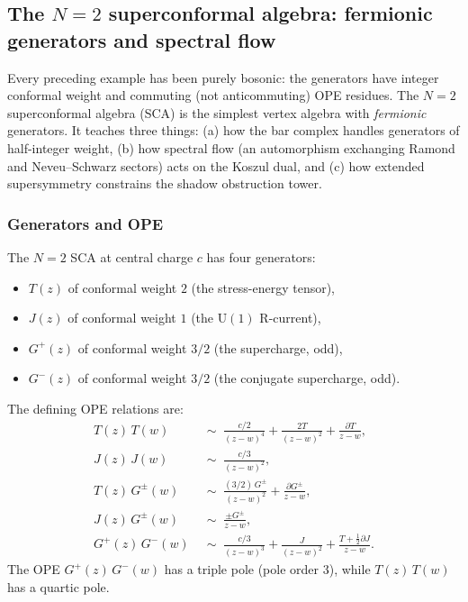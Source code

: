 %
%

\subsection{The \texorpdfstring{$N{=}2$}{N=2} superconformal algebra:
 fermionic generators and spectral flow}
\label{subsec:n2-sca}

Every preceding example has been purely bosonic: the generators have
integer conformal weight and commuting (not anticommuting) OPE
residues. The $N{=}2$ superconformal algebra (SCA) is the simplest
vertex algebra with \emph{fermionic} generators. It teaches three
things: (a) how the bar complex handles generators of half-integer
weight, (b) how spectral flow (an automorphism exchanging Ramond and
Neveu--Schwarz sectors) acts on the Koszul dual, and
(c) how extended supersymmetry constrains the shadow obstruction tower.

\subsubsection{Generators and OPE}

The $N{=}2$ SCA at central charge $c$ has four generators:
\begin{itemize}[nosep]
\item $T(z)$ of conformal weight $2$ (the stress-energy tensor),
\item $J(z)$ of conformal weight $1$ (the $\mathrm{U}(1)$ R-current),
\item $G^+(z)$ of conformal weight $3/2$ (the supercharge, odd),
\item $G^-(z)$ of conformal weight $3/2$ (the conjugate supercharge, odd).
\end{itemize}
The defining OPE relations are:
\begin{align}
 T(z)\,T(w) &\;\sim\; \frac{c/2}{(z-w)^4}
 + \frac{2T}{(z-w)^2} + \frac{\partial T}{z-w},
 \label{eq:N2-TT} \\
 J(z)\,J(w) &\;\sim\; \frac{c/3}{(z-w)^2},
 \label{eq:N2-JJ} \\
 T(z)\,G^\pm(w) &\;\sim\;
 \frac{(3/2)\,G^\pm}{(z-w)^2} + \frac{\partial G^\pm}{z-w},
 \label{eq:N2-TG} \\
 J(z)\,G^\pm(w) &\;\sim\; \frac{\pm G^\pm}{z-w},
 \label{eq:N2-JG} \\
 G^+(z)\,G^-(w) &\;\sim\;
 \frac{c/3}{(z-w)^3} + \frac{J}{(z-w)^2}
 + \frac{T + \frac{1}{2}\partial J}{z-w}.
 \label{eq:N2-GG}
\end{align}
The OPE $G^+(z)\,G^-(w)$ has a triple pole (pole order $3$), while
$T(z)\,T(w)$ has a quartic pole.

